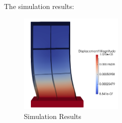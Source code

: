 The simulation results:

\begin{figure}[H]
  \centering
  \includegraphics[width = 5cm]{./Figure-files/nonlinear_analysis_steps/structure/imposed_motion/imposed_motion_results.png}
  \caption{Simulation Results}
  \label{fig_simulate}
\end{figure}


